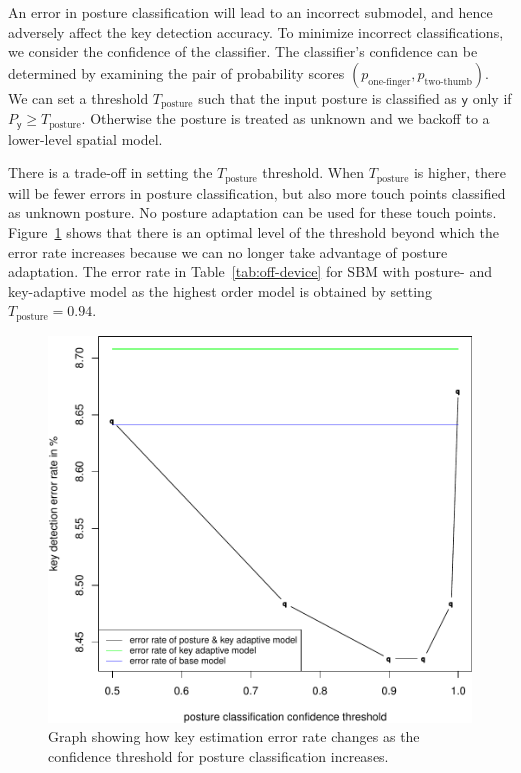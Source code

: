 \documentclass{sigchi}
\begin{document}
An error in posture classification will lead to an incorrect submodel,
and hence adversely affect the key detection accuracy. To minimize incorrect classifications, we consider the confidence of the classifier.  The classifier's confidence can be determined by examining the pair of probability
scores $(p_{\text{one-finger}}, p_{\text{two-thumb}})$.
We can set a threshold $T_{\text{posture}}$ such that the input posture is classified
as $\textsf{y}$ only if $P_\textsf{y} \ge T_{\text{posture}}$. Otherwise the posture is treated as
unknown and we backoff to a lower-level spatial model.

There is a trade-off in setting the $T_{\text{posture}}$ threshold. When
$T_{\text{posture}}$ is higher, there will be fewer errors in posture classification, but also more touch points classified as unknown posture. No posture adaptation can be used for these touch points. Figure~\ref{fig:posture-confidence}
shows that there is an optimal level of the threshold beyond which the error rate
increases because we can no longer take advantage of posture adaptation. The error rate in Table~\ref{tab:off-device} for SBM with posture- and key-adaptive model as the highest order model is obtained by setting $T_{\text{posture}} = 0.94$.

\begin{figure}[tb]
\includegraphics[width=0.9\columnwidth]{figures/error-confidence-cropped.pdf}
 \caption{Graph showing how key estimation error rate changes as the confidence
 threshold for posture classification increases.}
 \label{fig:posture-confidence}
\end{figure}
\end{document}
